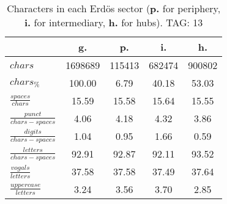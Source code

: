 \begin{table}[h!]
\begin{center}
\begin{tabular}{| l || c | c | c | c |}\hline
 & {\bf g.} & {\bf p.} & {\bf i.} & {\bf h.} \\\hline\hline
$chars$ & 1698689  & 115413  & 682474  & 900802 \\
$chars_{\%}$ & 100.00  & 6.79  & 40.18  & 53.03 \\\hline
$\frac{spaces}{chars}$ & 15.59  & 15.58  & 15.64  & 15.55 \\
$\frac{punct}{chars-spaces}$ & 4.06  & 4.18  & 4.32  & 3.86 \\
$\frac{digits}{chars-spaces}$ & 1.04  & 0.95  & 1.66  & 0.59 \\\hline
$\frac{letters}{chars-spaces}$ & 92.91  & 92.87  & 92.11  & 93.52 \\
$\frac{vogals}{letters}$ & 37.58  & 37.58  & 37.49  & 37.64 \\
$\frac{uppercase}{letters}$ & 3.24  & 3.56  & 3.70  & 2.85 \\\hline
\end{tabular}
\caption{Characters in each Erd\"os sector ({{\bf p.}} for periphery, {{\bf i.}} for intermediary, 
    {{\bf h.}} for hubs). TAG: 13}
\end{center}
\end{table}
